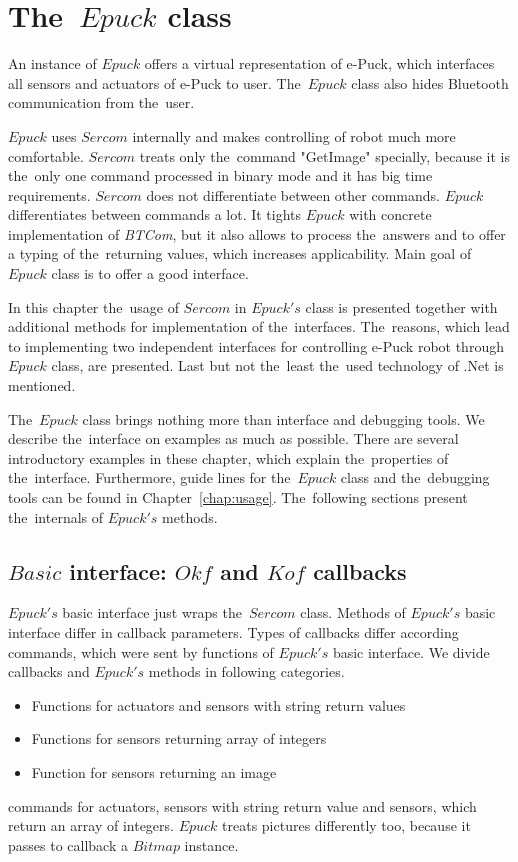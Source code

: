 \section{The~$Epuck$ class} \label{sec:epuck}
  An instance of $Epuck$ offers a virtual representation of e-Puck,
  which interfaces all sensors and actuators of e-Puck to user. 
  The~$Epuck$ class also hides Bluetooth communication from the~user.

  $Epuck$ uses $Sercom$ internally and makes controlling of robot much more comfortable.
  $Sercom$ treats only the~command "GetImage" specially, because it is the~only one command 
  processed in binary mode
  and it has big time requirements. $Sercom$ does not differentiate between other commands.
  $Epuck$ differentiates between commands a lot. 
  It tights $Epuck$ with concrete implementation of {\it BTCom},
  but it also allows to process the~answers and to offer a typing of the~returning values, which increases
  applicability. Main goal of $Epuck$ class is to offer a good interface.

  In this chapter the~usage of $Sercom$ in $Epuck's$ class is presented together with additional methods 
  for implementation of the~interfaces. The~reasons, which lead to implementing two independent interfaces for
  controlling e-Puck robot through $Epuck$ class, are presented.
  Last but not the~least the~used technology of .Net is mentioned.

  The~$Epuck$ class brings nothing more than interface and debugging tools. We describe the~interface
  on examples as much as possible. There are several introductory examples in these chapter,
  which explain the~properties of the~interface. Furthermore, 
  guide lines for the~$Epuck$ class and the~debugging
  tools can be found in Chapter~\ref{chap:usage}.
  The~following sections present the~internals of $Epuck's$ methods.
  
\subsection{$Basic$ interface: $Okf$ and $Kof$ callbacks} \label{sec:okfkofi}
  $Epuck's$ basic interface just wraps the~$Sercom$ class. Methods of $Epuck's$ basic interface
  differ in callback parameters. Types of callbacks differ according commands, which
  were sent by functions of $Epuck's$ basic interface. 
  We divide callbacks and $Epuck's$ methods in following categories.
  \begin{itemize}
    \item Functions for actuators and sensors with string return values
    \item Functions for sensors returning array of integers
    \item Function for sensors returning an image 
  \end{itemize}
  commands for actuators, sensors with string return value and sensors, which return an array of integers.
  $Epuck$ treats pictures differently too, because it passes to callback a $Bitmap$ instance.


